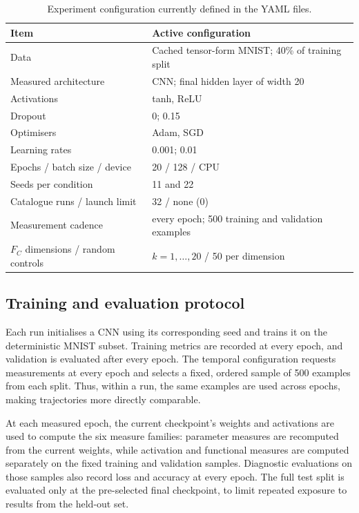 \documentclass[11pt,a4paper]{article}
\begin{document}
\begin{table}[H]
    \centering
    \caption{Experiment configuration currently defined in the YAML files.}
    \label{tab:setup}
    \begin{tabular}{@{}ll@{}}
        \toprule
        Item & Active configuration \\
        \midrule
        Data & Cached tensor-form MNIST; 40\% of training split \\
        Measured architecture & CNN; final hidden layer of width 20 \\
        Activations & tanh, ReLU \\
        Dropout & 0; 0.15 \\
        Optimisers & Adam, SGD \\
        Learning rates & 0.001; 0.01 \\
        Epochs / batch size / device & 20 / 128 / CPU \\
        Seeds per condition & 11 and 22 \\
        Catalogue runs / launch limit & 32 / none (0) \\
        Measurement cadence & every epoch; 500 training and validation examples \\
        $F_C$ dimensions / random controls & $k=1,\ldots,20$ / 50 per dimension \\
        \bottomrule
    \end{tabular}
\end{table}

\subsection{Training and evaluation protocol}

Each run initialises a CNN using its corresponding seed and trains it on the deterministic MNIST subset. Training metrics are recorded at every epoch, and validation is evaluated after every epoch. The temporal configuration requests measurements at every epoch and selects a fixed, ordered sample of 500 examples from each split. Thus, within a run, the same examples are used across epochs, making trajectories more directly comparable.

At each measured epoch, the current checkpoint's weights and activations are used to compute the six measure families: parameter measures are recomputed from the current weights, while activation and functional measures are computed separately on the fixed training and validation samples. Diagnostic evaluations on those samples also record loss and accuracy at every epoch. The full test split is evaluated only at the pre-selected final checkpoint, to limit repeated exposure to results from the held-out set.
\end{document}
